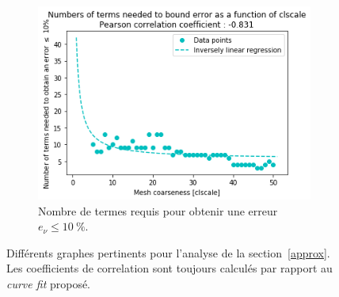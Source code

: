 \documentclass[11pt]{article}
\begin{document}
\begin{figure}[H]
\begin{subfigure}[t]{0.32\textwidth}
		\includegraphics[width=\linewidth]{clscale10.png}
		\caption{Nombre de termes requis pour obtenir une erreur $e_{\nu} \le \SI{10}{\percent}$.}
		\label{fig:clscale10}
	\end{subfigure}
	\caption{Différents graphes pertinents pour l'analyse de la section~\ref{approx}.
	Les coefficients de correlation sont toujours calculés par rapport au \emph{curve fit} proposé.}
	\label{fig:figsec2}
\end{figure}
\end{document}
